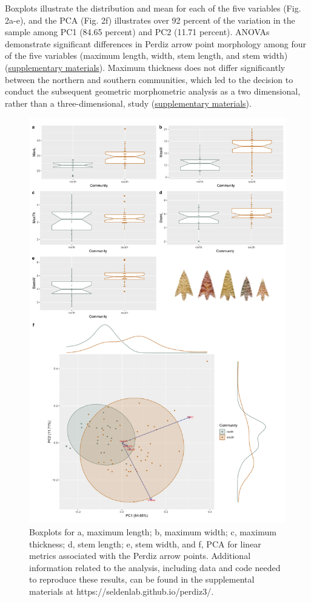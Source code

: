 \documentclass[smallextended]{svjour3}       %
\begin{document}
Boxplots illustrate the distribution and mean for each of the five
variables (Fig. 2a-e), and the PCA (Fig. 2f) illustrates over 92 percent
of the variation in the sample among PC1 (84.65 percent) and PC2 (11.71
percent). ANOVAs demonstrate significant differences in Perdiz arrow
point morphology among four of the five variables (maximum length,
width, stem length, and stem width)
(\href{https://seldenlab.github.io/perdiz3/}{supplementary materials}).
Maximum thickness does not differ significantly between the northern and
southern communities, which led to the decision to conduct the
subsequent geometric morphometric analysis as a two dimensional, rather
than a three-dimensional, study
(\href{https://seldenlab.github.io/perdiz3/}{supplementary materials}).

\begin{figure}
\includegraphics[width=0.95\linewidth]{ms-figs/figure2} \caption{Boxplots for a, maximum length; b, maximum width; c, maximum thickness; d, stem length; e, stem width, and f, PCA for linear metrics associated with the Perdiz arrow points. Additional information related to the analysis, including data and code needed to reproduce these results, can be found in the supplemental materials at https://seldenlab.github.io/perdiz3/.}\label{fig:fig2}
\end{figure}
\end{document}
